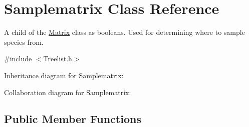 \hypertarget{class_samplematrix}{}\section{Samplematrix Class Reference}
\label{class_samplematrix}


A child of the \hyperlink{class_matrix}{Matrix} class as booleans. Used for determining where to sample species from.  




{\ttfamily \#include $<$Treelist.\+h$>$}



Inheritance diagram for Samplematrix\+:


Collaboration diagram for Samplematrix\+:
\subsection*{Public Member Functions}
